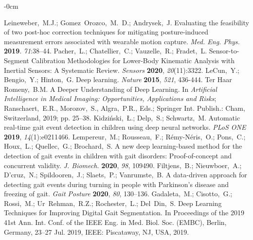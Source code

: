\documentclass[sensors,article,submit,pdftex,moreauthors]{Definitions/mdpi}
\begin{document}
\begin{adjustwidth}{-\extralength}{0cm}
\begin{thebibliography}{999}
	Leineweber,~M.J.; Gomez~Orozco,~M.~D.; Andrysek,~J. Evaluating the feasibility of two post-hoc correction techniques for mitigating posture-induced measurement errors associated with wearable motion capture. {\em Med. Eng. Phys.} {\bf 2019}. {\em 71}:38–44.
	Pacher,~L.; Chatellier,~C.; Vauzelle,~R.; Fradet,~L. Sensor-to-Segment Calibration Methodologies for Lower-Body Kinematic Analysis with Inertial Sensors: A Systematic Review. {\em Sensors} {\bf 2020}, {\em 20}(11):3322.	
	LeCun,~Y.; Bengio,~Y.; Hinton,~G. Deep learning. {\em Nature} {\bf 2015}, {\em 521}, 436-444.
	Ter Haar Romeny,~B.M. A Deeper Understanding of Deep Learning. In {\em Artificial Intelligence in Medical Imaging: Opportunities, Applications and Risks}; Ranschaert,~E.R., Morozov,~S., Algra,~P.R., Eds.; Springer Int. Publish.: Cham, Switzerland, 2019; pp. 25--38.	
	Kidzi\'{n}ski,~{\L}.; Delp,~S.; Schwartz,~M. Automatic real-time gait event detection in children using deep neural networks. {\em PLoS ONE} {\bf 2019}, {\em 14}(1):e0211466.
	Lempereur,~M.; Rousseau,~F.; R\'{e}my-N\'{e}ris,~O.; Pons,~C.; Houx,~L.; Quellec,~G.; Brochard,~S. A new deep learning-based method for the detection of gait events in children with gait disorders: Proof-of-concept and concurrent validity. {\em J. Biomech.} {\bf 2020}, {\em 98}, 109490.
	Filtjens,~B.; Nieuwboer,~A.; D'cruz,~N.; Spildooren,~J.; Slaets,~P.; Vanrumste,~B. A data-driven approach for detecting gait events during turning in people with Parkinson's disease and freezing of gait. {\em Gait Posture} {\bf 2020}, {\em 80}, 130--136.
	Gadaleta,~M.; Cisotto,~G.; Rossi,~M.; Ur~Rehman,~R.Z.; Rochester,~L.; Del~Din,~S. Deep Learning Techniques for Improving Digital Gait Segmentation. In Proceedings of the 2019 41st Ann. Int. Conf. of the IEEE Eng. in Med. Biol. Soc. (EMBC), Berlin, Germany, 23--27 Jul. 2019, IEEE: Piscataway, NJ, USA, 2019.
	

\end{thebibliography}
\end{adjustwidth}
\end{document}
